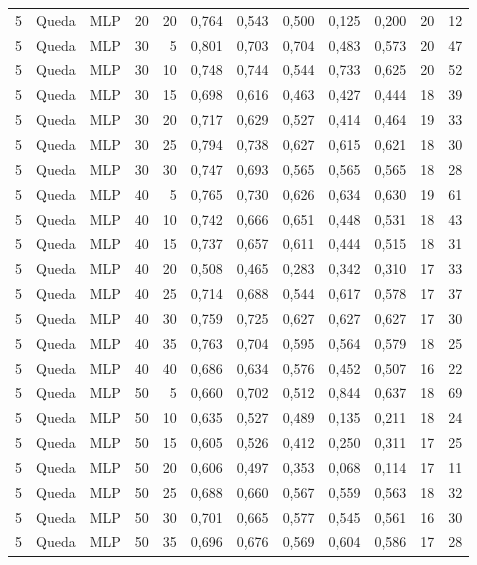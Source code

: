 \begin{longtable}{@{}rllrrrrrrrrr@{}}
5 & Queda & MLP & 20 & 20 & 0,764 & 0,543 & 0,500 & 0,125 & 0,200 & 20 & 12 \\
5 & Queda & MLP & 30 & 5 & 0,801 & 0,703 & 0,704 & 0,483 & 0,573 & 20 & 47 \\
5 & Queda & MLP & 30 & 10 & 0,748 & 0,744 & 0,544 & 0,733 & 0,625 & 20 & 52 \\
5 & Queda & MLP & 30 & 15 & 0,698 & 0,616 & 0,463 & 0,427 & 0,444 & 18 & 39 \\
5 & Queda & MLP & 30 & 20 & 0,717 & 0,629 & 0,527 & 0,414 & 0,464 & 19 & 33 \\
5 & Queda & MLP & 30 & 25 & 0,794 & 0,738 & 0,627 & 0,615 & 0,621 & 18 & 30 \\
5 & Queda & MLP & 30 & 30 & 0,747 & 0,693 & 0,565 & 0,565 & 0,565 & 18 & 28 \\
5 & Queda & MLP & 40 & 5 & 0,765 & 0,730 & 0,626 & 0,634 & 0,630 & 19 & 61 \\
5 & Queda & MLP & 40 & 10 & 0,742 & 0,666 & 0,651 & 0,448 & 0,531 & 18 & 43 \\
5 & Queda & MLP & 40 & 15 & 0,737 & 0,657 & 0,611 & 0,444 & 0,515 & 18 & 31 \\
5 & Queda & MLP & 40 & 20 & 0,508 & 0,465 & 0,283 & 0,342 & 0,310 & 17 & 33 \\
5 & Queda & MLP & 40 & 25 & 0,714 & 0,688 & 0,544 & 0,617 & 0,578 & 17 & 37 \\
5 & Queda & MLP & 40 & 30 & 0,759 & 0,725 & 0,627 & 0,627 & 0,627 & 17 & 30 \\
5 & Queda & MLP & 40 & 35 & 0,763 & 0,704 & 0,595 & 0,564 & 0,579 & 18 & 25 \\
5 & Queda & MLP & 40 & 40 & 0,686 & 0,634 & 0,576 & 0,452 & 0,507 & 16 & 22 \\
5 & Queda & MLP & 50 & 5 & 0,660 & 0,702 & 0,512 & 0,844 & 0,637 & 18 & 69 \\
5 & Queda & MLP & 50 & 10 & 0,635 & 0,527 & 0,489 & 0,135 & 0,211 & 18 & 24 \\
5 & Queda & MLP & 50 & 15 & 0,605 & 0,526 & 0,412 & 0,250 & 0,311 & 17 & 25 \\
5 & Queda & MLP & 50 & 20 & 0,606 & 0,497 & 0,353 & 0,068 & 0,114 & 17 & 11 \\
5 & Queda & MLP & 50 & 25 & 0,688 & 0,660 & 0,567 & 0,559 & 0,563 & 18 & 32 \\
5 & Queda & MLP & 50 & 30 & 0,701 & 0,665 & 0,577 & 0,545 & 0,561 & 16 & 30 \\
5 & Queda & MLP & 50 & 35 & 0,696 & 0,676 & 0,569 & 0,604 & 0,586 & 17 & 28 \\

\end{longtable}
